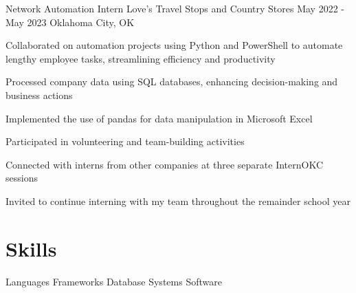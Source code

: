 \documentclass[letterpaper]{resumeconfig}
\begin{document}
\WorkExperience
    {Network Automation Intern} %
    {Love's Travel Stops and Country Stores} %
    {May 2022 - May 2023} %
    {Oklahoma City, OK} %
    {
        \item Collaborated on automation projects using Python and PowerShell to automate lengthy employee tasks, streamlining efficiency and productivity
        \item Processed company data using SQL databases, enhancing decision-making and business actions
        \item Implemented the use of pandas for data manipulation in Microsoft Excel
        \item Participated in volunteering and team-building activities
        \item Connected with interns from other companies at three separate InternOKC sessions
        \item Invited to continue interning with my team throughout the remainder school year
    }
    

\section{Skills}

\begin{Skills}
	\SkillCategory
	{Languages}
	{
		    
	}
	\SkillCategory
	{Frameworks}
	{
		      
	}
	\SkillCategory
	{Database Systems}
	{
		   
	}
	\SkillCategory
	{Software}
	{
		     \skill{\LaTeX}
	}	
\end{Skills}
\vspace{-0.5em}
\end{document}
